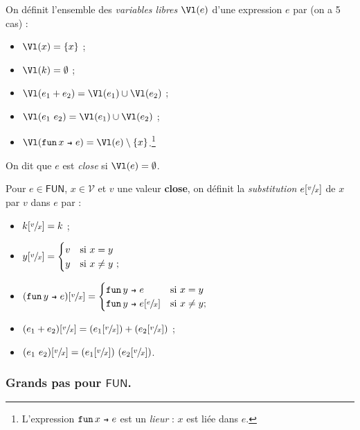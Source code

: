 \documentclass[../main]{subfiles}
\begin{document}
  \begin{defn}
    On définit l'ensemble des \textit{variables libres} $\Vl(e)$ d'une expression $e$ par (on a 5 cas) :
    \begin{itemize}
      \item $\Vl(x) = \{x\}$ ;
      \item $\Vl(k) = \emptyset$ ;
      \item $\Vl(e_1 + e_2) = \Vl(e_1) \cup \Vl(e_2)$ ;
      \item $\Vl(e_1\ e_2) = \Vl(e_1) \cup \Vl(e_2)$ ;
      \item $\Vl(\fun x e) = \Vl(e) \setminus \{x\}$.\footnote{L'expression $\fun x e$ est un \textit{lieur} : $x$ est liée dans $e$.}
    \end{itemize}

    On dit que $e$ est \textit{close} si $\Vl(e) = \emptyset$.
  \end{defn}

  \begin{defn}
    Pour $e \in \mathsf{FUN}$, $x \in \mathcal{V}$ et $v$ une valeur \textbf{close}, on définit la \textit{substitution} $e[\sfrac{v}{x}]$ de $x$ par $v$ dans $e$ par :
    \begin{itemize}
      \item $k[\sfrac{v}{x}] = k$ ;
      \item $y[\sfrac{v}{x}] = \begin{cases}
          v & \text{si}\ x = y\\
          y & \text{si}\ x \neq y\ ;
      \end{cases}$
      \item $(\fun y e)[\sfrac{v}{x}] = \begin{cases}
          \fun y e & \text{si}\ x = y\\
          \fun y e[\sfrac{e}{x}] & \text{si}\ x \neq y ;
      \end{cases}$
      \item $(e_1 + e_2)[\sfrac{v}{x}] = (e_1[\sfrac{v}{x}]) + (e_2[\sfrac{v}{x}])$ ;
      \item $(e_1 \ e_2)[\sfrac{v}{x}] = (e_1[\sfrac{v}{x}]) \ (e_2[\sfrac{v}{x}])$.
    \end{itemize}
  \end{defn}

  \subsubsection{Grands pas pour $\mathsf{FUN}$.}
\end{document}
